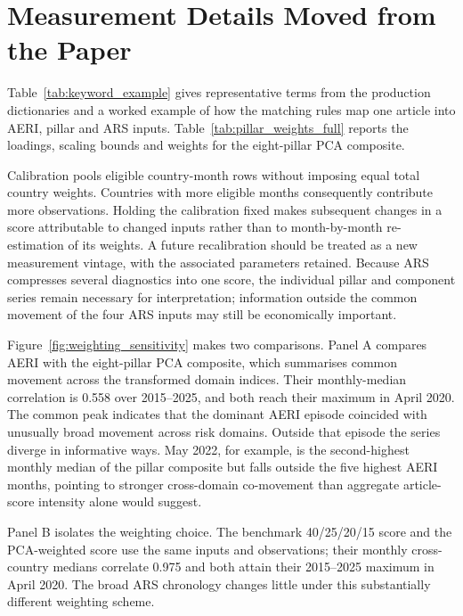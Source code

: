 \documentclass[11pt]{article}
\begin{document}
\section{Measurement Details Moved from the Paper}\label{sec:s_measure}
Table~\ref{tab:keyword_example} gives representative terms from the production dictionaries and a worked example of how the matching rules map one article into AERI, pillar and ARS inputs. Table~\ref{tab:pillar_weights_full} reports the loadings, scaling bounds and weights for the eight-pillar PCA composite.



Calibration pools eligible country-month rows without imposing equal total country weights. Countries with more eligible months consequently contribute more observations. Holding the calibration fixed makes subsequent changes in a score attributable to changed inputs rather than to month-by-month re-estimation of its weights. A future recalibration should be treated as a new measurement vintage, with the associated parameters retained. Because ARS compresses several diagnostics into one score, the individual pillar and component series remain necessary for interpretation; information outside the common movement of the four ARS inputs may still be economically important.

Figure~\ref{fig:weighting_sensitivity} makes two comparisons. Panel A compares AERI with the eight-pillar PCA composite, which summarises common movement across the transformed domain indices. Their monthly-median correlation is 0.558 over 2015--2025, and both reach their maximum in April 2020. The common peak indicates that the dominant AERI episode coincided with unusually broad movement across risk domains. Outside that episode the series diverge in informative ways. May 2022, for example, is the second-highest monthly median of the pillar composite but falls outside the five highest AERI months, pointing to stronger cross-domain co-movement than aggregate article-score intensity alone would suggest.

Panel B isolates the weighting choice. The benchmark 40/25/20/15 score and the PCA-weighted score use the same inputs and observations; their monthly cross-country medians correlate 0.975 and both attain their 2015--2025 maximum in April 2020. The broad ARS chronology changes little under this substantially different weighting scheme.
\end{document}
